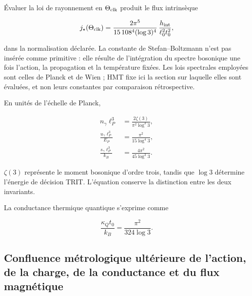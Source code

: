 Évaluer la loi de rayonnement en \(\Theta_{\rm clk}\) produit le flux intrinsèque

\begin{equation}
j_\star(\Theta_{\rm clk})
=\frac{2\pi^5}{15\,108^4(\log3)^4}\,
\frac{h_{\rm int}}{\ell_0^2t_0^2},
\label{p12-83-c13-s2:eq:stefan-hmt}
\end{equation}

dans la normalisation déclarée. La constante de Stefan--Boltzmann n'est pas insérée comme primitive : elle résulte de l'intégration du spectre bosonique une fois l'action, la propagation et la température fixées.
Les lois spectrales employées sont celles de Planck et de Wien \cite{rm:Planck,rm:Wien} ; HMT fixe ici la section sur laquelle elles sont évaluées, et non leurs constantes par comparaison rétrospective.

En unités de l'échelle de Planck,

\begin{align}
n_\gamma\ell_P^3
&=\frac{2\zeta(3)}{\pi^2\log^3 3},
\label{p12-83-c13-s2:eq:photon-number}\\
\frac{u_\gamma\ell_P^3}{E_P}
&=\frac{\pi^2}{15\log^4 3},
\label{p12-83-c13-s2:eq:photon-energy}\\
\frac{s_\gamma\ell_P^3}{k_B}
&=\frac{4\pi^2}{45\log^3 3}.
\label{p12-83-c13-s2:eq:photon-entropy}
\end{align}

\(\zeta(3)\) représente le moment bosonique d'ordre trois, tandis que
\(\log3\) détermine l'énergie de décision TRIT. L'équation conserve la
distinction entre les deux invariants.

La conductance thermique quantique s'exprime comme

\begin{equation}
\frac{\kappa_Qt_0}{k_B}=\frac{\pi^2}{324\log3}.
\label{p12-83-c13-s2:eq:thermal-conductance}
\end{equation}

\subsection{Confluence métrologique ultérieure de l'action, de la charge, de la conductance et du flux magnétique}

